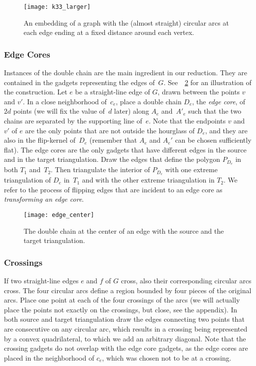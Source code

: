 \documentclass[11pt,a4paper]{article}
\begin{document}
\begin{figure}
\centering
\texttt{[image: k33\_larger]}
\caption{An embedding of a graph with the (almost straight) circular arcs at each edge ending at a fixed distance around each vertex.}
\label{fig_k33}
\end{figure}

\subsubsection{Edge Cores}
Instances of the double chain are the main ingredient in our reduction.
They are contained in the gadgets representing the edges of~$G$.
See~\figurename~\ref{fig_edge_center} for an illustration of the construction.
Let $e$ be a straight-line edge of $G$, drawn between the points $v$ and $v'$.
In a close neighborhood of~$c_e$, place a double chain $D_e$, the \emph{edge core}, of $2d$ points (we will fix the value of~$d$ later) along $A_e$ and~$A'_e$ such that the two chains are separated by the supporting line of~$e$.
Note that the endpoints $v$ and $v'$ of $e$ are the only points that are not outside the hourglass of $D_e$, and they are also in the flip-kernel of~$D_e$ (remember that $A_e$ and $A_e'$ can be chosen sufficiently flat).
The edge cores are the only gadgets that have different edges in the source and in the target triangulation.
Draw the edges that define the polygon $P_{D_e}$ in both $T_1$ and~$T_2$.
Then triangulate the interior of $P_{D_e}$ with one extreme triangulation of $D_e$ in~$T_1$ and with the other extreme triangulation in $T_2$.
We refer to the process of flipping edges that are incident to an edge core as \emph{transforming an edge core}.

\begin{figure}
\centering
\texttt{[image: edge\_center]}
\caption{The double chain at the center of an edge with the source and the target triangulation.}
\label{fig_edge_center}
\end{figure}


\subsubsection{Crossings}
If two straight-line edges $e$ and $f$ of $G$ cross, also their corresponding circular arcs cross.
The four circular arcs define a region bounded by four pieces of the original arcs.
Place one point at each of the four crossings of the arcs (we will actually place the points not exactly on the crossings, but close, see the appendix).
In both source and target triangulation draw the edges connecting two points that are consecutive on any circular arc, which results in a crossing being represented by a convex quadrilateral, to which we add an arbitrary diagonal.
Note that the crossing gadgets do not overlap with the edge core gadgets, as the edge cores are placed in the neighborhood of $c_e$, which was chosen not to be at a crossing.
\end{document}
